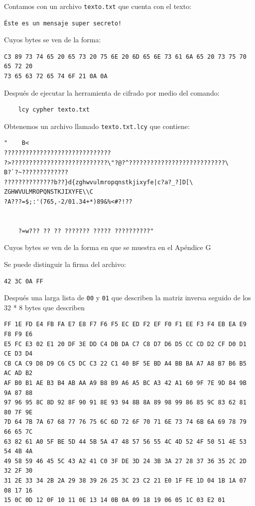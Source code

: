 \documentclass[a4paper]{article}
\begin{document}
Contamos con un archivo \texttt{texto.txt} que cuenta con el texto:

\begin{verbatim}
Éste es un mensaje super secreto!

\end{verbatim}

Cuyos bytes se ven de la forma:

\begin{verbatim}
C3 89 73 74 65 20 65 73 20 75 6E 20 6D 65 6E 73 61 6A 65 20 73 75 70 65 72 20
73 65 63 72 65 74 6F 21 0A 0A
\end{verbatim}

Después de ejecutar la herramienta de cifrado por medio del comando:

\begin{verbatim}
    lcy cypher texto.txt
\end{verbatim}

Obtenemos un archivo llamado \texttt{texto.txt.lcy} que contiene:

\begin{verbatim}
"    B<
??????????????????????????????
?>???????????????????????????\"?@?^???????????????????????????\
B?`?~?????????????
??????????????b??}d{zghwvulmropqnstkjixyfe|c?a?_?]D[\
ZGHWVULMROPQNSTKJIXYFE\\C
?A???=$;:'(765,-2/01.34+*)89&%<#?!??


    ?=w??? ?? ?? ??????? ????? ??????????"
\end{verbatim}

Cuyos bytes se ven de la forma en que se muestra en el Apéndice G

Se puede distinguir la firma del archivo:

\begin{verbatim}
42 3C 0A FF 
\end{verbatim}

Después una larga lista de \texttt{00} y \texttt{01} que describen la matriz
inversa seguido de los 32 * 8 bytes que describen 

\begin{verbatim}
FF 1E FD E4 FB FA E7 E8 F7 F6 F5 EC ED F2 EF F0 F1 EE F3 F4 EB EA E9 F8 F9 E6
E5 FC E3 02 E1 20 DF 3E DD C4 DB DA C7 C8 D7 D6 D5 CC CD D2 CF D0 D1 CE D3 D4
CB CA C9 D8 D9 C6 C5 DC C3 22 C1 40 BF 5E BD A4 BB BA A7 A8 B7 B6 B5 AC AD B2
AF B0 B1 AE B3 B4 AB AA A9 B8 B9 A6 A5 BC A3 42 A1 60 9F 7E 9D 84 9B 9A 87 88
97 96 95 8C 8D 92 8F 90 91 8E 93 94 8B 8A 89 98 99 86 85 9C 83 62 81 80 7F 9E
7D 64 7B 7A 67 68 77 76 75 6C 6D 72 6F 70 71 6E 73 74 6B 6A 69 78 79 66 65 7C
63 82 61 A0 5F BE 5D 44 5B 5A 47 48 57 56 55 4C 4D 52 4F 50 51 4E 53 54 4B 4A
49 58 59 46 45 5C 43 A2 41 C0 3F DE 3D 24 3B 3A 27 28 37 36 35 2C 2D 32 2F 30
31 2E 33 34 2B 2A 29 38 39 26 25 3C 23 C2 21 E0 1F FE 1D 04 1B 1A 07 08 17 16
15 0C 0D 12 0F 10 11 0E 13 14 0B 0A 09 18 19 06 05 1C 03 E2 01
\end{verbatim}
\end{document}
